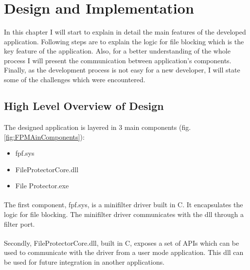 	\newpage		
	\section{Design and Implementation}
		\paragraph{}
		In this chapter I will start to explain in detail the main features of the developed application. Following steps are to explain the logic for file blocking which is the key feature of the application. Also, for a better understanding of the whole process I will present the communication between application's components. Finally, as the development process is not easy for a new developer, I will state some of the challenges which were encountered.
	
		\subsection{High Level Overview of Design}
		\paragraph{}
		The designed application is layered in 3 main components (fig.\ref{fig:FPMAinComponents}):
		\begin{itemize}
			\item fpf.sys
			\item FileProtectorCore.dll
			\item File Protector.exe
		\end{itemize}
		
		\paragraph{}
		The first component, fpf.sys, is a minifilter driver built in C. It encapsulates the logic for file blocking. The minifilter driver communicates with the dll through a filter port.
		
		\paragraph{}
		Secondly, FileProtectorCore.dll, built in C, exposes a set of APIs which can be used to communicate with the driver from a user mode application. This dll can be used for future integration in another applications.
		
